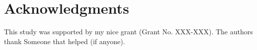 \section*{Acknowledgments}
\label{sec:acknowledgments}
This study was supported by my nice grant (Grant No. XXX-XXX).
The authors thank Someone that helped (if anyone).